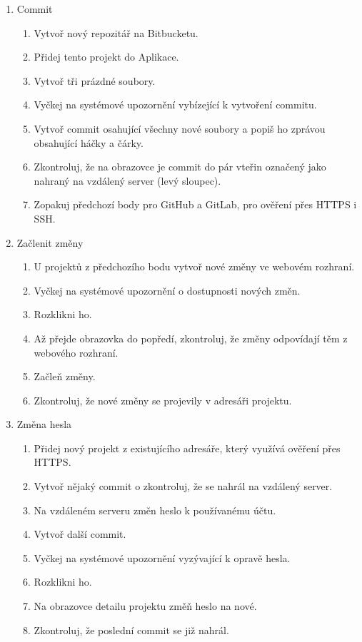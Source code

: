 \begin{enumerate}
	\item Commit
	\begin{enumerate}
		\item Vytvoř nový repozitář na Bitbucketu.
		\item Přidej tento projekt do Aplikace.
		\item Vytvoř tři prázdné soubory.
		\item Vyčkej na systémové upozornění vybízející k vytvoření commitu.
		\item Vytvoř commit osahující všechny nové soubory a popiš ho zprávou obsahující háčky a čárky.
		\item Zkontroluj, že na obrazovce  je commit do pár vteřin označený jako nahraný na vzdálený server (levý sloupec).
		\item Zopakuj předchozí body pro GitHub a GitLab, pro ověření přes HTTPS i SSH.
	\end{enumerate}
	\item Začlenit změny
	\begin{enumerate}
		\item U projektů z předchozího bodu vytvoř nové změny ve webovém rozhraní.
		\item Vyčkej na systémové upozornění o dostupnosti nových změn.
		\item Rozklikni ho.
		\item Až přejde obrazovka  do popředí, zkontroluj, že změny odpovídají těm z webového rozhraní.
		\item Začleň změny.
		\item Zkontroluj, že nové změny se projevily v adresáři projektu.
	\end{enumerate}
	\item Změna hesla
	\begin{enumerate}
		\item Přidej nový projekt z existujícího adresáře, který využívá ověření přes HTTPS.
		\item Vytvoř nějaký commit o zkontroluj, že se nahrál na vzdálený server.
		\item Na vzdáleném serveru změn heslo k používanému účtu.
		\item Vytvoř další commit.
		\item Vyčkej na systémové upozornění vyzývající k opravě hesla.
		\item Rozklikni ho.
		\item Na obrazovce detailu projektu změň heslo na nové.
		\item Zkontroluj, že poslední commit se již nahrál.

\end{enumerate}
\end{enumerate}

